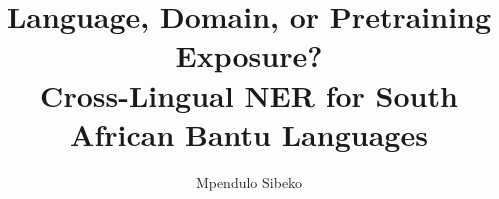 \documentclass{sigkddExp}
\begin{document}
\title{Language, Domain, or Pretraining Exposure?\\
Cross-Lingual NER for South African Bantu Languages}
\author{
\alignauthor Mpendulo Sibeko\\
\\
\\
}
\date{}
\maketitle















\end{document}
